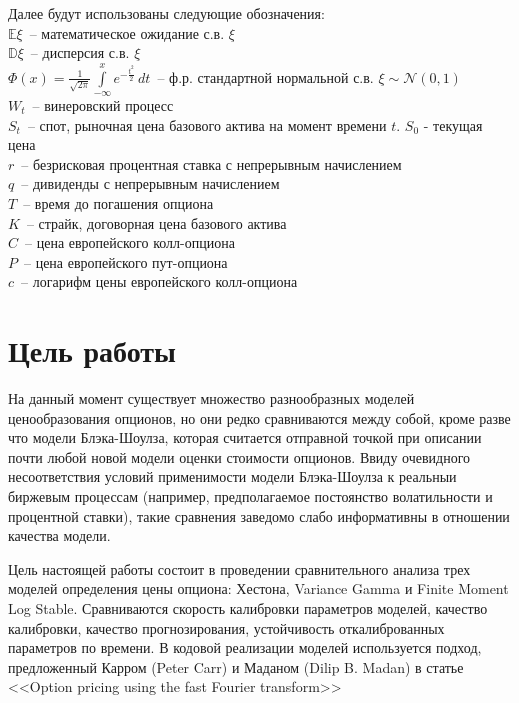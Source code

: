 \documentclass[oneside, final, 12pt, a4paper]{article}
\begin{document}
Далее будут использованы следующие обозначения:\\
$\mathbb{E}\xi$~-- математическое ожидание с.в. $\xi$\\
$\mathbb{D}\xi$~-- дисперсия с.в. $\xi$\\
$\displaystyle \Phi(x)=\frac{1}{\sqrt{2\pi}}\int\limits_{-\infty}^{x}e^{-\frac{t^2}{2}}\,dt$~-- ф.р. стандартной нормальной с.в. \( \xi \sim \mathcal{N}(0, 1)\) \\
$W_t$~-- винеровский процесс\\
$S_t$~-- спот, рыночная цена базового актива на момент времени $t$. $S_0$ - текущая цена\\
$r$~-- безрисковая процентная ставка с непрерывным начислением\\
$q$~-- дивиденды с непрерывным начислением\\
$T$~-- время до погашения опциона\\
$K$~-- страйк, договорная цена базового актива\\
$C$~-- цена европейского колл-опциона\\
$P$~-- цена европейского пут-опциона\\
$c$~-- логарифм цены европейского колл-опциона

\newpage
\section{Цель работы}
На данный момент существует множество разнообразных моделей ценообразования опционов, но они редко сравниваются между собой, кроме разве что модели Блэка-Шоулза, которая считается отправной точкой при описании почти любой новой модели оценки стоимости опционов. Ввиду очевидного несоответствия условий применимости модели Блэка-Шоулза к реальныи биржевым процессам (например, предполагаемое постоянство волатильности и процентной ставки), такие сравнения заведомо слабо информативны в отношении качества модели. \par

Цель настоящей работы состоит в проведении сравнительного анализа трех моделей определения цены опциона: Хестона, Variance Gamma и Finite Moment Log Stable. Сравниваются скорость калибровки параметров моделей, качество калибровки, качество прогнозирования, устойчивость откалиброванных параметров по времени. В кодовой реализации моделей используется подход, предложенный Карром (Peter Carr) и Маданом (Dilip B. Madan) в статье <<Option pricing using the fast Fourier transform>>\cite{FFT:paper}
\end{document}
